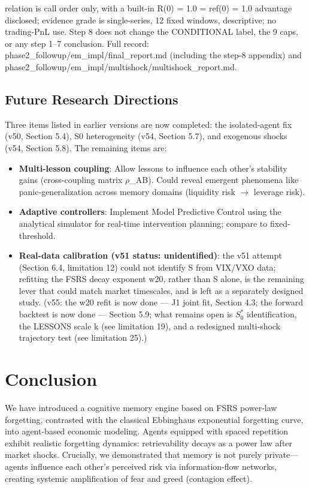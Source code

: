 \documentclass[11pt]{article}
\begin{document}
\begin{enumerate}
relation is call order only, with a built-in R(0) = 1.0 = ref(0) = 1.0 advantage disclosed; evidence grade is single-series, 12 fixed windows, descriptive; no trading-PnL use. Step 8 does not change the CONDITIONAL label, the 9 caps, or any step 1--7 conclusion. Full record: phase2\_followup/em\_impl/final\_report.md (including the step-8 appendix) and phase2\_followup/em\_impl/multishock/multishock\_report.md.
\end{enumerate}

\subsection{Future Research Directions}
Three items listed in earlier versions are now completed: the isolated-agent fix (v50, Section 5.4), S0 heterogeneity (v54, Section 5.7), and exogenous shocks (v54, Section 5.8). The remaining items are:

\begin{itemize}
\item \textbf{Multi-lesson coupling}: Allow lessons to influence each other's stability gains (cross-coupling matrix $\rho$\_AB). Could reveal emergent phenomena like panic-generalization across memory domains (liquidity risk $\rightarrow$ leverage risk).
\item \textbf{Adaptive controllers}: Implement Model Predictive Control using the analytical simulator for real-time intervention planning; compare to fixed-threshold.
\item \textbf{Real-data calibration (v51 status: unidentified)}: the v51 attempt (Section 6.4, limitation 12) could not identify S from VIX/VXO data; refitting the FSRS decay exponent w20, rather than S alone, is the remaining lever that could match market timescales, and is left as a separately designed study. (v55: the w20 refit is now done --- J1 joint fit, Section 4.3; the forward backtest is now done --- Section 5.9; what remains open is $S_0^*$ identification, the LESSONS scale k (see limitation 19), and a redesigned multi-shock trajectory test (see limitation 25).)
\end{itemize}

\section{Conclusion}
We have introduced a cognitive memory engine based on FSRS power-law forgetting, contrasted with the classical Ebbinghaus exponential forgetting curve, into agent-based economic modeling. Agents equipped with spaced repetition exhibit realistic forgetting dynamics: retrievability decays as a power law after market shocks. Crucially, we demonstrated that memory is not purely private---agents influence each other's perceived risk via information-flow networks, creating systemic amplification of fear and greed (contagion effect).
\end{document}
